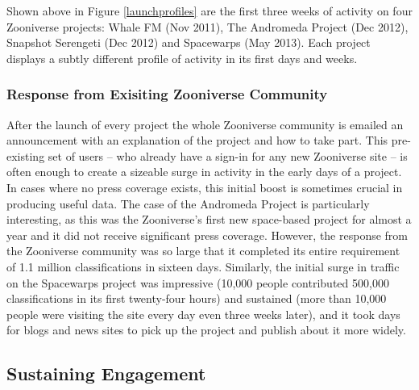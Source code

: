 \documentclass{sigchi}
\begin{document}
Shown above in Figure \ref{launchprofiles} are the first three weeks of activity on four Zooniverse projects: Whale FM (Nov 2011), The Andromeda Project (Dec 2012), Snapshot Serengeti (Dec 2012) and Spacewarps (May 2013). Each project displays a subtly different profile of activity in its first days and weeks. %


\subsubsection{Response from Exisiting Zooniverse Community}

After the launch of every project the whole Zooniverse community is emailed an announcement with an explanation of the project and how to take part. This pre-existing set of users -- who already have a sign-in for any new Zooniverse site -- is often enough to create a sizeable surge in activity in the early days of a project. In cases where no press coverage exists, this initial boost is sometimes crucial in producing useful data. The case of the Andromeda Project is particularly interesting, as this was the Zooniverse's first new space-based project for almost a year and it did not receive significant press coverage. However, the response from the Zooniverse community was so large that it completed its entire requirement of 1.1 million classifications in sixteen days. Similarly, the initial surge in traffic on the Spacewarps project was impressive (10,000 people contributed 500,000 classifications in its first twenty-four hours) and sustained (more than 10,000 people were visiting the site every day even three weeks later), and it took days for blogs and news sites to pick up the project and publish about it more widely.


\subsection{Sustaining Engagement}
\end{document}
